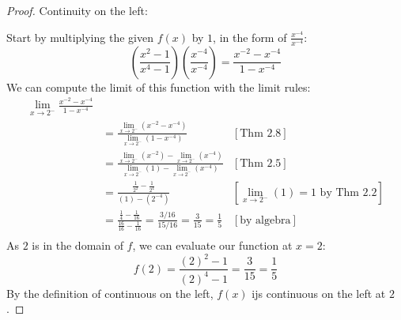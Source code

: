 \documentclass{article}
\begin{document}
  \begin{proof}
    Continuity on the left:
    
    Start by multiplying the given $f(x)$ by $1$, in the form of $\frac{x^{-4}}{x^{-4}}$:
    \begin{equation*}
      (\frac{x^2-1}{x^4-1})(\frac{x^{-4}}{x^{-4}}) = \frac{x^{-2} - x^{-4}}{1 - x^{-4}}
    \end{equation*}
    We can compute the limit of this function with the limit rules:
    \begin{align*}
      \lim_{x \rightarrow 2^-}\frac{x^{-2} - x^{-4}}{1 - x^{-4}} & &\\
      &= \frac{\lim_{x \rightarrow 2^-}(x^{-2} - x^{-4})}{\lim_{x \rightarrow 2^-}(1 - x^{-4})} & [\text{Thm 2.8}] \\
      &= \frac{\lim_{x \rightarrow 2^-}(x^{-2}) - \lim_{x \rightarrow 2^-}(x^{-4})}
              {\lim_{x \rightarrow 2^-}(1) - \lim_{x \rightarrow 2^-}(x^{-4})} & [\text{Thm 2.5}] \\
      &= \frac{\frac{1}{2^2} - \frac{1}{2^4}}{(1) - (2^{-4})} & [\lim_{x \rightarrow 2^-}(1) = 1\text{ by Thm 2.2}] \\
      &= \frac{\frac{1}{4} - \frac{1}{16}}{\frac{16}{16} - \frac{1}{16}} = \frac{3/16}{15/16} = \frac{3}{15} = \frac{1}{5} & [\text{by algebra}] \\
      & &
    \end{align*}
    As $2$ is in the domain of $f$, we can evaluate our function at $x=2$:
    \begin{equation*}
      f(2) = \frac{(2)^2-1}{(2)^4-1} = \frac{3}{15} = \frac{1}{5}
    \end{equation*}
    By the definition of continuous on the left, $f(x)$ ijs continuous on the left at $2$.
  \end{proof}
\end{document}
